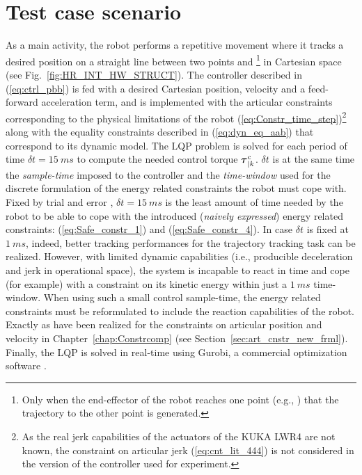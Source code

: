 \section{Test case scenario}
\label{subsec_test_case_scenario_2}
As a main activity, the robot performs a repetitive movement where it tracks a desired position on a straight line between two points  and \footnote{Only when the end-effector of the robot reaches one point (e.g., ) that the trajectory to the other point  is generated.} in Cartesian space (see Fig.~\ref{fig:HR_INT_HW_STRUCT}). The controller described in (\ref{eq:ctrl_pbb}) is fed with a desired Cartesian position, velocity and a feed-forward acceleration term, and is implemented with the articular constraints corresponding to the physical limitations of the robot (\ref{eq:Constr_time_step})\footnote{As the real jerk capabilities of the actuators of the KUKA LWR4 are not known, the constraint on articular jerk (\ref{eq:cnt_lit_444}) is not considered in the version of the controller used for experiment.} along with the equality constraints described in (\ref{eq:dyn_eq_aab}) that correspond to its dynamic model. The LQP problem is solved for each period of time $\delta t = 15~ms$ to compute the needed control torque $\mbox{\boldmath${\tau}$}_{|k}^{c}$. $\delta t$ is at the same time the \textit{sample-time} imposed to the controller and the \textit{time-window} used for the discrete formulation of the energy related constraints the robot must cope with. Fixed by trial and error , $\delta t = 15~ms$ is the least amount of time needed by the robot to be able to cope with the introduced (\textit{naively expressed}) energy related constraints: (\ref{eq:Safe_constr_1}) and (\ref{eq:Safe_constr_4}). In case $\delta t$ is fixed at $1~ms$, indeed, better tracking performances for the trajectory tracking task can be realized. However, with limited dynamic capabilities (i.e., producible deceleration and jerk in operational space), the system is incapable to react in time and cope (for example) with a constraint on its kinetic energy within just a  $1~ms$ time-window. When using such a small control sample-time, the energy related constraints must be reformulated to include the reaction capabilities of the robot. Exactly as have been realized for the constraints on articular position and velocity in Chapter~\ref{chap:Constrcomp} (see Section~\ref{sec:art_cnstr_new_frml}). Finally, the LQP is solved in real-time using Gurobi, a commercial optimization software \cite{gurobi}. 
